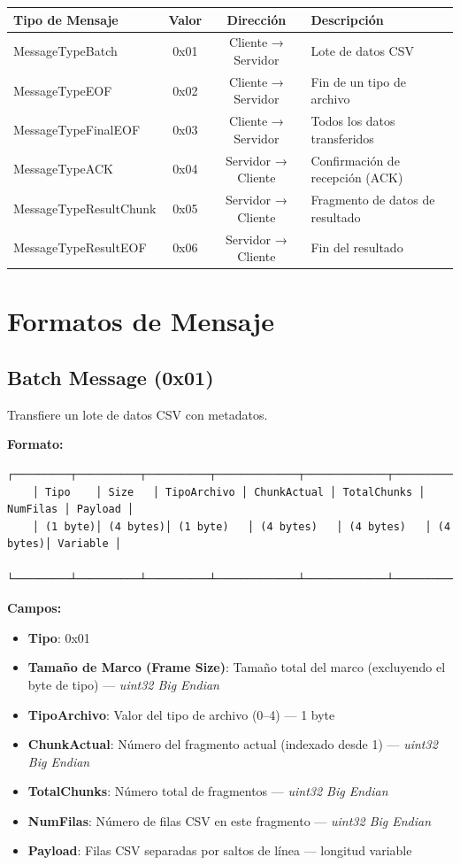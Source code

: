 \documentclass[titlepage,a4paper]{article}
\begin{document}
\begin{longtable}{|l|c|c|p{7cm}|}
	\hline
	\textbf{Tipo de Mensaje} & \textbf{Valor} & \textbf{Dirección} & \textbf{Descripción} \\
	\hline
	MessageTypeBatch & 0x01 & Cliente → Servidor & Lote de datos CSV \\
	\hline
	MessageTypeEOF & 0x02 & Cliente → Servidor & Fin de un tipo de archivo \\
	\hline
	MessageTypeFinalEOF & 0x03 & Cliente → Servidor & Todos los datos transferidos \\
	\hline
	MessageTypeACK & 0x04 & Servidor → Cliente & Confirmación de recepción (ACK) \\
	\hline
	MessageTypeResultChunk & 0x05 & Servidor → Cliente & Fragmento de datos de resultado \\
	\hline
	MessageTypeResultEOF & 0x06 & Servidor → Cliente & Fin del resultado \\
	\hline
\end{longtable}

\section{Formatos de Mensaje}

\subsection{Batch Message (0x01)}

Transfiere un lote de datos CSV con metadatos.

\textbf{Formato:}
\begin{lstlisting}[basicstyle=\ttfamily\scriptsize,breaklines=true]
	┌─────────┬──────────┬──────────┬─────────────┬─────────────┬──────────┬─────────┐
	│ Tipo    │ Size   │ TipoArchivo │ ChunkActual │ TotalChunks │ NumFilas │ Payload │
	│ (1 byte)│ (4 bytes)│ (1 byte)   │ (4 bytes)   │ (4 bytes)   │ (4 bytes)│ Variable │
	└─────────┴──────────┴──────────┴─────────────┴─────────────┴──────────┴─────────┘
\end{lstlisting}

\textbf{Campos:}
\begin{itemize}
	\item \textbf{Tipo}: 0x01
	\item \textbf{Tamaño de Marco (Frame Size)}: Tamaño total del marco (excluyendo el byte de tipo) — \textit{uint32 Big Endian}
	\item \textbf{TipoArchivo}: Valor del tipo de archivo (0–4) — 1 byte
	\item \textbf{ChunkActual}: Número del fragmento actual (indexado desde 1) — \textit{uint32 Big Endian}
	\item \textbf{TotalChunks}: Número total de fragmentos — \textit{uint32 Big Endian}
	\item \textbf{NumFilas}: Número de filas CSV en este fragmento — \textit{uint32 Big Endian}
	\item \textbf{Payload}: Filas CSV separadas por saltos de línea — longitud variable
\end{itemize}
\end{document}
